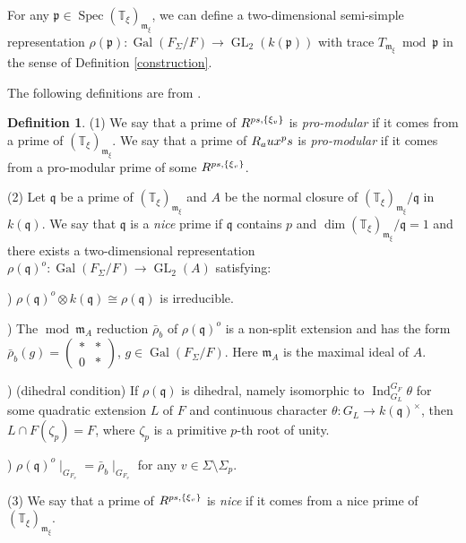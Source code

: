 \documentclass[12pt]{amsart}
\theoremstyle{plain}
\theoremstyle{definition}
\newtheorem{defn}[thm]{Definition}
\theoremstyle{remark}
\begin{document}
For any $\mathfrak{p} \in \operatorname{Spec} (\mathbb{T}_{\xi})_{\mathfrak{m}_{\xi}} $, we can define a two-dimensional semi-simple representation $\rho(\mathfrak{p}): \operatorname{Gal}(F_{\Sigma}/F) \to \operatorname{GL}_2(k(\mathfrak{p}))$ with trace $T_{\mathfrak{m}_{\xi}}~\operatorname{mod}~\mathfrak{p}$ in the sense of Definition \ref{construction}.

The following definitions are from \cite[Section 4.1]{pan2022fontaine}.

\begin{defn}\label{nice}
	(1) We say that a prime  of $ R^{\textnormal{ps}, \{\xi_v\}}$ is \textit{pro-modular} if it comes from a prime of $(\mathbb{T}_{\xi})_{\mathfrak{m}_{\xi}} $. We say that a prime of $ R_\textnormal{aux}^\textnormal{ps}$ is \textit{pro-modular} if it comes from a pro-modular prime of some $ R^{\textnormal{ps}, \{\xi_v\}}$.
	
	(2) Let $\mathfrak{q} $ be a prime of $ (\mathbb{T}_{\xi})_{\mathfrak{m}_{\xi}} $ and $A$ be the normal closure of $(\mathbb{T}_{\xi})_{\mathfrak{m}_{\xi}} / \mathfrak{q} $ in $k(\mathfrak{q})$. We say that $\mathfrak{q} $ is a \textit{nice} prime if $\mathfrak{q} $ contains $p$ and $\operatorname{dim} (\mathbb{T}_{\xi})_{\mathfrak{m}_{\xi}} / \mathfrak{q}=1$ and there exists a two-dimensional representation $\rho(\mathfrak{q})^o : \operatorname{Gal}(F_{\Sigma}/F) \to \operatorname{GL}_2(A)$ satisfying:
	
	) $\rho(\mathfrak{q})^o \otimes k(\mathfrak{q}) \cong \rho(\mathfrak{q})$ is irreducible.
	
	) The $\operatorname{mod}~\mathfrak{m}_A$ reduction $\bar{\rho}_b$ of $\rho(\mathfrak{q})^o$ is a non-split extension and has the form $ \bar{\rho}_b(g)=\begin{pmatrix}
		* & *\\
		0 & *
	\end{pmatrix}$, $g \in \operatorname{Gal}(F_{\Sigma}/F)$. Here $\mathfrak{m}_A $ is the maximal ideal of $A$.
	
	) (dihedral condition) If $\rho(\mathfrak{q}) $ is dihedral, namely isomorphic to $\operatorname{Ind}_{G_L}^{G_F} \theta$ for some quadratic extension $L$ of $F$ and continuous character $\theta: G_L \to k(\mathfrak{q})^\times$, then $L \cap F(\zeta_p) = F$,
	where $\zeta_p $ is a primitive $p$-th root of unity.
	
	) $\rho(\mathfrak{q})^o \mid_{G_{F_v}} = \bar{\rho}_b \mid_{G_{F_v}} $ for any $v \in \Sigma \setminus \Sigma_p$.
	
	(3) We say that a prime of $ R^{\textnormal{ps}, \{\xi_v\}}$ is \textit{nice} if it comes from a nice prime of $(\mathbb{T}_{\xi})_{\mathfrak{m}_{\xi}} $.
	
\end{defn}
\end{document}
